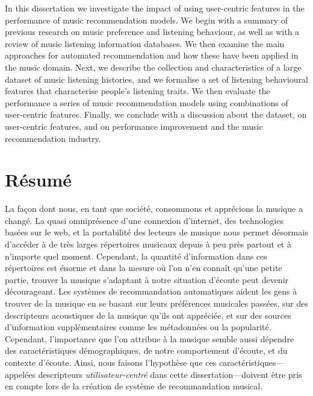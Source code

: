 \documentclass[12pt,letterpaper]{report}
\begin{document}
In this dissertation we investigate the impact of using user-centric features in the performance of music recommendation models.
We begin with a summary of previous research on music preference and listening behaviour, as well as with a review of music listening information databases. We then examine the main approaches for automated recommendation and how these have been applied in the music domain. 
Next, we describe the collection and characteristics of a large dataset of music listening histories, and we formalise a set of listening behavioural features that characterise people's listening traits. 
We then evaluate the performance a series of music recommendation models using combinations of user-centric features.
Finally, we conclude with a discussion about the dataset, on user-centric features, and on performance improvement and the music recommendation industry. 




\section*{\centering R\'esum\'e}

La façon dont nous, en tant que société, consommons et apprécions la musique a changé. La quasi omniprésence d’une connexion d’internet, des technologies basées sur le web, et la portabilité des lecteurs de musique nous permet désormais d’accéder à de très larges répertoires musicaux depuis à peu près partout et à n’importe quel moment. Cependant, la quantité d’information dans ces répertoires est énorme et dans la mesure où l’on n’en connaît qu’une petite partie, trouver la musique s’adaptant à notre situation d’écoute peut devenir décourageant. Les systèmes de recommandation automatiques aident les gens à trouver de la musique en se basant sur leurs préférences musicales passées, sur des descripteurs acoustiques de la musique qu’ils ont appréciée, et sur des sources d’information supplémentaires comme les métadonnées ou la popularité. Cependant, l’importance que l’on attribue à la musique semble aussi dépendre des caractéristiques démographiques, de notre comportement d’écoute, et du contexte d’écoute. Ainsi, nous faisons l’hypothèse que ces caractéristiques---appelées descripteurs \textit{utilisateur-centré} dans cette dissertation---doivent être pris en compte lors de la création de système de recommandation musical. 
\end{document}
